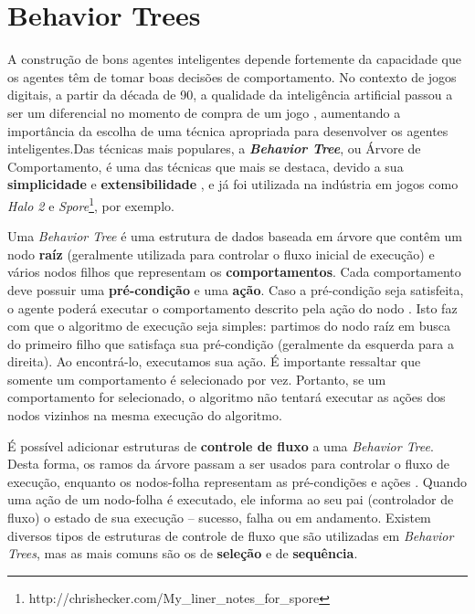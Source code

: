 \section{\label{section:behavior-trees}Behavior Trees}
A construção de bons agentes inteligentes depende fortemente da capacidade que
os agentes têm de tomar boas decisões de comportamento. No contexto de jogos
digitais, a partir da década de 90, a qualidade da inteligência artificial
passou a ser um diferencial no momento de compra de um jogo \cite[Cap.
1]{Millington:2009:AIG:1795711}, aumentando a importância da escolha de uma
técnica apropriada para desenvolver os agentes inteligentes.Das técnicas mais
populares, a \textbf{\textit{Behavior Tree}}, ou Árvore de Comportamento, é uma
das técnicas que mais se destaca, devido a sua \textbf{simplicidade} e
\textbf{extensibilidade} \cite[Cap.  4]{Rabin:2013:GAP:2566761}, e já foi
utilizada na indústria em jogos como \textit{Halo 2} \cite[Cap.
5]{Millington:2009:AIG:1795711} e
\textit{Spore}\footnote{http://chrishecker.com/My\_liner\_notes\_for\_spore},
por exemplo.

Uma \textit{Behavior Tree} é uma estrutura de dados baseada em árvore que contêm
um nodo \textbf{raíz} (geralmente utilizada para controlar o fluxo inicial de
execução) e vários nodos filhos que representam os \textbf{comportamentos}. Cada
comportamento deve possuir uma \textbf{pré-condição} e uma \textbf{ação}. Caso a
pré-condição seja satisfeita, o agente poderá executar o comportamento descrito
pela ação do nodo \cite[Cap. 4]{Rabin:2013:GAP:2566761}. Isto faz com que o
algoritmo de execução seja simples: partimos do nodo raíz em busca do primeiro
filho que satisfaça sua pré-condição (geralmente da esquerda para a direita). Ao
encontrá-lo, executamos sua ação. É importante ressaltar que somente um
comportamento é selecionado por vez. Portanto, se um comportamento for
selecionado, o algoritmo não tentará executar as ações dos nodos vizinhos na
mesma execução do algoritmo.

É possível adicionar estruturas de \textbf{controle de fluxo} a uma
\textit{Behavior Tree}. Desta forma, os ramos da árvore passam a ser usados para
controlar o fluxo de execução, enquanto os nodos-folha representam as
pré-condições e ações \cite[Cap. 10]{Rabin:2015:GAP:2821138}. Quando uma ação de
um nodo-folha é executado, ele informa ao seu pai (controlador de fluxo) o
estado de sua execução -- sucesso, falha ou em andamento. Existem diversos
tipos de estruturas de controle de fluxo que são utilizadas em \textit{Behavior
Trees}, mas as mais comuns são os de \textbf{seleção} e de \textbf{sequência}.

